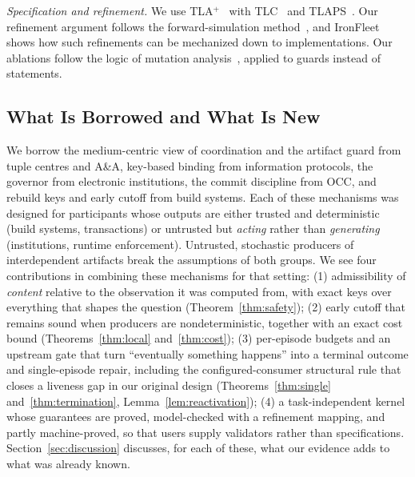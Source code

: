 \emph{Specification and refinement.} We use TLA$^+$~\cite{lamport1994tla,lamport2002specifying} with TLC~\cite{yu1999tlc} and TLAPS~\cite{cousineau2012tlaps}. Our refinement argument follows the forward-simulation method~\cite{lynch1995simulations,abadi1991refinement}, and IronFleet~\cite{ironfleet} shows how such refinements can be mechanized down to implementations. Our ablations follow the logic of mutation analysis~\cite{jia2011mutation}, applied to guards instead of statements.

\subsection{What Is Borrowed and What Is New}
We borrow the medium-centric view of coordination and the artifact guard from tuple centres and A\&A, key-based binding from information protocols, the governor from electronic institutions, the commit discipline from OCC, and rebuild keys and early cutoff from build systems. Each of these mechanisms was designed for participants whose outputs are either trusted and deterministic (build systems, transactions) or untrusted but \emph{acting} rather than \emph{generating} (institutions, runtime enforcement). Untrusted, stochastic producers of interdependent artifacts break the assumptions of both groups. We see four contributions in combining these mechanisms for that setting:
(1) admissibility of \emph{content} relative to the observation it was computed from, with exact keys over everything that shapes the question (Theorem~\ref{thm:safety});
(2) early cutoff that remains sound when producers are nondeterministic, together with an exact cost bound (Theorems~\ref{thm:local} and~\ref{thm:cost});
(3) per-episode budgets and an upstream gate that turn ``eventually something happens'' into a terminal outcome and single-episode repair, including the configured-consumer structural rule that closes a liveness gap in our original design (Theorems~\ref{thm:single} and~\ref{thm:termination}, Lemma~\ref{lem:reactivation});
(4) a task-independent kernel whose guarantees are proved, model-checked with a refinement mapping, and partly machine-proved, so that users supply validators rather than specifications.
Section~\ref{sec:discussion} discusses, for each of these, what our evidence adds to what was already known.
